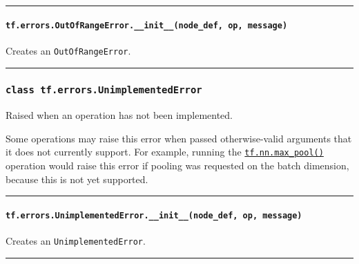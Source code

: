 \begin{center}\rule{0.5\linewidth}{\linethickness}\end{center}

\paragraph{\texorpdfstring{\texttt{tf.errors.OutOfRangeError.\_\_init\_\_(node\_def,\ op,\ message)}
}{tf.errors.OutOfRangeError.\_\_init\_\_(node\_def, op, message) }}\label{tf.errors.outofrangeerror.ux5fux5finitux5fux5fnodeux5fdef-op-message}

Creates an \texttt{OutOfRangeError}.

\begin{center}\rule{0.5\linewidth}{\linethickness}\end{center}

\subsubsection{\texorpdfstring{\texttt{class\ tf.errors.UnimplementedError}
}{class tf.errors.UnimplementedError }}\label{class-tf.errors.unimplementederror}

Raised when an operation has not been implemented.

Some operations may raise this error when passed otherwise-valid
arguments that it does not currently support. For example, running the
\href{../../api_docs/python/nn.md\#max_pool}{\texttt{tf.nn.max\_pool()}}
operation would raise this error if pooling was requested on the batch
dimension, because this is not yet supported.

\begin{center}\rule{0.5\linewidth}{\linethickness}\end{center}

\paragraph{\texorpdfstring{\texttt{tf.errors.UnimplementedError.\_\_init\_\_(node\_def,\ op,\ message)}
}{tf.errors.UnimplementedError.\_\_init\_\_(node\_def, op, message) }}\label{tf.errors.unimplementederror.ux5fux5finitux5fux5fnodeux5fdef-op-message}

Creates an \texttt{UnimplementedError}.

\begin{center}\rule{0.5\linewidth}{\linethickness}\end{center}

